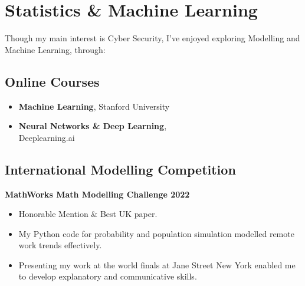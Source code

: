 \documentclass{Resume}
\begin{document}
	\section{Statistics \& Machine Learning}
	    Though my main interest is Cyber Security, I've enjoyed exploring Modelling and Machine Learning, through:
			
		\subsection{Online Courses}
			\begin{itemize}[itemsep=1mm, parsep=0pt]
				\item \textbf{Machine Learning}, Stanford University
				\item \textbf{Neural Networks \& Deep Learning}, \\ Deeplearning.ai 
			\end{itemize}

		\subsection{International Modelling Competition}
			\textbf{MathWorks Math Modelling Challenge 2022} 
			\begin{itemize}
			    \item Honorable Mention \& Best UK paper.
			    \item My Python code for probability and population simulation modelled remote work trends effectively.
			    \item Presenting my work at the world finals at Jane Street New York enabled me to develop explanatory and communicative skills.
			\end{itemize}


\end{document}
